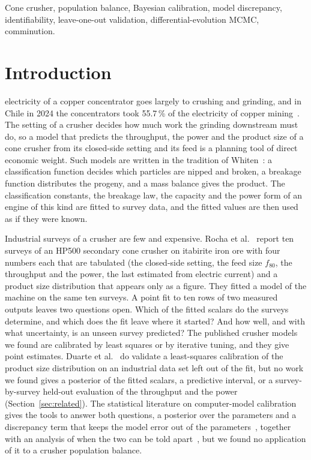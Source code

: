 \documentclass[journal]{IEEEtran}
\begin{document}
\begin{IEEEkeywords}
Cone crusher, population balance, Bayesian calibration, model discrepancy, identifiability, leave-one-out validation,
differential-evolution MCMC, comminution.
\end{IEEEkeywords}

\section{Introduction}\label{sec:intro}

 electricity of a copper concentrator goes largely to crushing and grinding, and in Chile in 2024 the
concentrators took 55.7\,\% of the electricity of copper mining~\cite{cochilco}. The setting of a crusher decides how much
work the grinding downstream must do, so a model that predicts the throughput, the power and the product size of a cone
crusher from its closed-side setting and its feed is a planning tool of direct economic weight. Such models are written in
the tradition of Whiten~\cite{whiten}: a classification function decides which particles are nipped and broken, a breakage
function distributes the progeny, and a mass balance gives the product. The classification constants, the breakage law,
the capacity and the power form of an engine of this kind are fitted to survey data, and the fitted values are then used as
if they were known.

Industrial surveys of a crusher are few and expensive. Rocha et al.~\cite{rocha} report ten surveys of an HP500
secondary cone crusher on itabirite iron ore with four numbers each that are tabulated (the closed-side setting, the feed
size $f_{80}$, the throughput and the power, the last estimated from electric current) and a product size
distribution that appears only as a figure. They fitted a model of the machine on the same ten surveys. A point fit to ten rows of two measured outputs leaves two
questions open. Which of the fitted scalars do the surveys determine, and which does the fit leave where it started? And
how well, and with what uncertainty, is an unseen survey predicted? The published crusher models we found are
calibrated by least squares or by iterative tuning, and they give point estimates. Duarte et al.~\cite{duarte} do validate
a least-squares calibration of the product size distribution on an industrial data set left out of the fit, but no work we
found gives a posterior of the fitted scalars, a predictive interval, or a survey-by-survey held-out evaluation of the
throughput and the power (Section~\ref{sec:related}). The statistical
literature on computer-model calibration gives the tools to answer both questions, a posterior over the parameters and a
discrepancy term that keeps the model error out of the parameters~\cite{ko,higdon,brynj}, together with an analysis of
when the two can be told apart~\cite{arendt,tuowu,plumlee}, but we found no application of it to a crusher population
balance.
\end{document}
